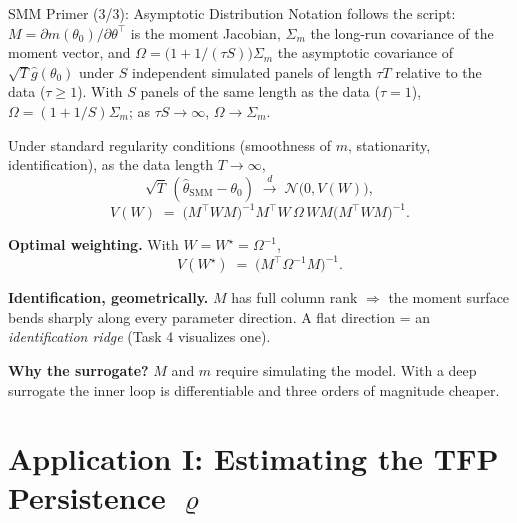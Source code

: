 \documentclass[10pt,aspectratio=169]{beamer}
\begin{document}
\begin{frame}{SMM Primer (3/3): Asymptotic Distribution}
\small
Notation follows the script: $M = \partial m(\theta_0)/\partial\theta^\top$ is the moment Jacobian, $\Sigma_m$ the long-run covariance of the moment vector, and $\Omega = \bigl(1 + 1/(\tau S)\bigr)\Sigma_m$ the asymptotic covariance of $\sqrt{T}\hat g(\theta_0)$ under $S$ independent simulated panels of length $\tau T$ relative to the data ($\tau \ge 1$).  With $S$ panels of the same length as the data ($\tau = 1$), $\Omega = (1+1/S)\Sigma_m$; as $\tau S \to \infty$, $\Omega \to \Sigma_m$.

\smallskip
Under standard regularity conditions (smoothness of $m$, stationarity, identification), as the data length $T\to\infty$,
\[
    \sqrt{T}\,(\widehat\theta_{\text{SMM}} - \theta_0)
    \;\xrightarrow{d}\; \mathcal{N}\bigl(0, V(W)\bigr),
\]
\[
    V(W) \;=\; \bigl(M^\top W M\bigr)^{-1} M^\top W \,\Omega\, W M \bigl(M^\top W M\bigr)^{-1}.
\]

\vspace{0.3em}
\textbf{Optimal weighting.} With $W = W^\star = \Omega^{-1}$,
\[
    V(W^\star) \;=\; \bigl(M^\top \Omega^{-1} M\bigr)^{-1}.
\]

\vspace{0.3em}
\textbf{Identification, geometrically.} $M$ has full column rank $\Rightarrow$ the moment surface bends sharply along every parameter direction. A flat direction = an \emph{identification ridge} (Task 4 visualizes one).

\vspace{0.3em}
\textbf{Why the surrogate?} $M$ and $m$ require simulating the model. With a deep surrogate the inner loop is differentiable and three orders of magnitude cheaper.
\end{frame}

\section{Application I: Estimating the TFP Persistence $\varrho$}
\end{document}
